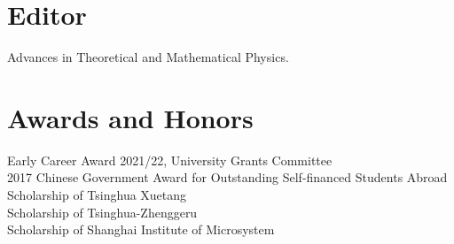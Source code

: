 \documentclass[hidelinks,a4paper]{article}
\begin{document}
\section*{Editor}
Advances in Theoretical and Mathematical Physics.



\section*{Awards and Honors}
Early Career Award 2021/22, University Grants Committee\\
2017 Chinese Government Award for Outstanding Self-financed Students
Abroad\\
Scholarship of Tsinghua Xuetang\\
Scholarship of Tsinghua-Zhenggeru\\
Scholarship of Shanghai Institute of Microsystem\\
\end{document}
